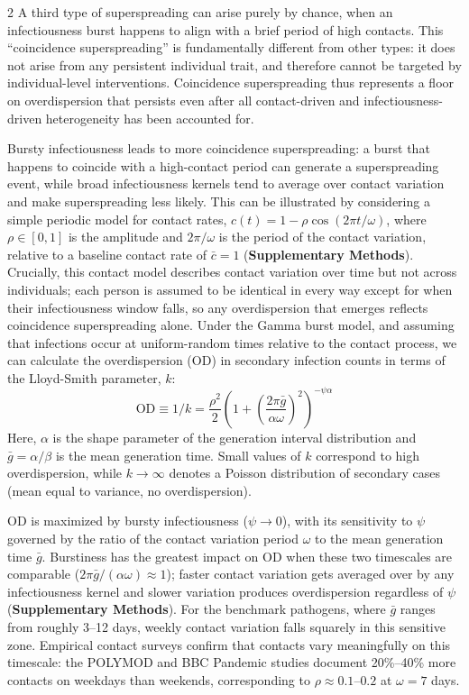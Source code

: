\documentclass[10pt]{article}
\begin{document}
\begin{multicols}{2}
A third type of superspreading can arise purely by chance, when an infectiousness burst happens to align with a brief period of high contacts. This ``coincidence superspreading'' is fundamentally different from other types: it does not arise from any persistent individual trait, and therefore cannot be targeted by individual-level interventions. Coincidence superspreading thus represents a floor on overdispersion that persists even after all contact-driven and infectiousness-driven heterogeneity has been accounted for. 

Bursty infectiousness leads to more coincidence superspreading: a burst that happens to coincide with a high-contact period can generate a superspreading event, while broad infectiousness kernels tend to average over contact variation and make superspreading less likely. This can be illustrated by considering a simple periodic model for contact rates, $c(t) = 1 - \rho \cos(2\pi t / \omega)$, where $\rho \in [0,1]$ is the amplitude and $2 \pi / \omega$ is the period of the contact variation, relative to a baseline contact rate of $\bar{c} = 1$ ({\bf Supplementary Methods}). Crucially, this contact model describes contact variation over time but not across individuals; each person is assumed to be identical in every way except for when their infectiousness window falls, so any overdispersion that emerges reflects coincidence superspreading alone. Under the Gamma burst model, and assuming that infections occur at uniform-random times relative to the contact process, we can calculate the overdispersion ($\text{OD}$) in secondary infection counts in terms of the Lloyd-Smith parameter, $k$: 
\begin{equation}
	\text{OD} \equiv 1/k = \frac{\rho^2}{2} \left( 1 + \left( \frac{2 \pi \bar{g}}{\alpha \omega} \right)^2 \right)^{-\psi \alpha}
\end{equation}
Here, $\alpha$ is the shape parameter of the generation interval distribution and $\bar{g} = \alpha / \beta$ is the mean generation time. Small values of $k$ correspond to high overdispersion, while $k \rightarrow \infty$ denotes a Poisson distribution of secondary cases (mean equal to variance, no overdispersion). 

$\text{OD}$ is maximized by bursty infectiousness ($\psi \rightarrow 0$), with its sensitivity to $\psi$ governed by the ratio of the contact variation period $\omega$ to the mean generation time $\bar{g}$. Burstiness has the greatest impact on $\text{OD}$ when these two timescales are comparable ($2 \pi \bar{g} / (\alpha \omega) \approx 1$); faster contact variation gets averaged over by any infectiousness kernel and slower variation produces overdispersion regardless of $\psi$ ({\bf Supplementary Methods}). For the benchmark pathogens, where $\bar{g}$ ranges from roughly 3--12 days, weekly contact variation falls squarely in this sensitive zone. Empirical contact surveys confirm that contacts vary meaningfully on this timescale: the POLYMOD and BBC Pandemic studies document 20\%--40\% more contacts on weekdays than weekends, corresponding to $\rho \approx 0.1$--$0.2$ at $\omega = 7$ days. 


\end{multicols}
\end{document}
